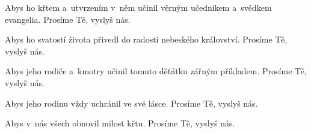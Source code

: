  Abys ho křtem a~utvrzením v~něm učinil věrným učedníkem a~svědkem
evangelia. \Rbardot{} Prosíme Tě, vyslyš nás.

 Abys ho svatostí života přivedl do radosti nebeského
království. \Rbardot{} Prosíme Tě, vyslyš nás.

 Abys jeho rodiče a~kmotry učinil tomuto děťátku zářným
příkladem. \Rbardot{} Prosíme Tě, vyslyš nás.

 Abys jeho rodinu vždy uchránil ve své lásce. \Rbardot{} Prosíme Tě, vyslyš nás.

 Abys v~nás všech obnovil milost křtu. \Rbardot{} Prosíme Tě, vyslyš nás.
